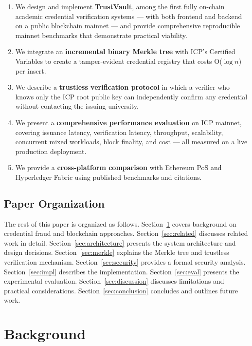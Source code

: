 \documentclass[journal]{IEEEtran}
\begin{document}
\begin{enumerate}
  \item We design and implement \textbf{TrustVault}, among the first fully on-chain academic credential verification systems — with both frontend and backend on a public blockchain mainnet — and provide comprehensive reproducible mainnet benchmarks that demonstrate practical viability.
  \item We integrate an \textbf{incremental binary Merkle tree} with ICP's Certified Variables to create a tamper-evident credential registry that costs O($\log n$) per insert.
  \item We describe a \textbf{trustless verification protocol} in which a verifier who knows only the ICP root public key can independently confirm any credential without contacting the issuing university.
  \item We present a \textbf{comprehensive performance evaluation} on ICP mainnet, covering issuance latency, verification latency, throughput, scalability, concurrent mixed workloads, block finality, and cost — all measured on a live production deployment.
  \item We provide a \textbf{cross-platform comparison} with Ethereum PoS and Hyperledger Fabric using published benchmarks and citations.
\end{enumerate}

\subsection{Paper Organization}

The rest of this paper is organized as follows. Section~\ref{sec:background} covers background on credential fraud and blockchain approaches. Section~\ref{sec:related} discusses related work in detail. Section~\ref{sec:architecture} presents the system architecture and design decisions. Section~\ref{sec:merkle} explains the Merkle tree and trustless verification mechanism. Section~\ref{sec:security} provides a formal security analysis. Section~\ref{sec:impl} describes the implementation. Section~\ref{sec:eval} presents the experimental evaluation. Section~\ref{sec:discussion} discusses limitations and practical considerations. Section~\ref{sec:conclusion} concludes and outlines future work.

\section{Background}
\label{sec:background}
\end{document}
